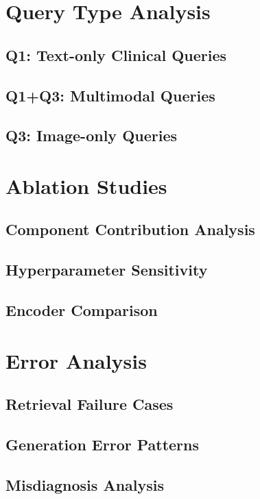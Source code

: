 %
%
\section{Query Type Analysis}
\label{sec:experiments:querytypes}

\subsection{Q1: Text-only Clinical Queries}
\label{subsec:experiments:querytypes:q1}

\subsection{Q1+Q3: Multimodal Queries}
\label{subsec:experiments:querytypes:q1q3}

\subsection{Q3: Image-only Queries}
\label{subsec:experiments:querytypes:q3}

%
%
\section{Ablation Studies}
\label{sec:experiments:ablation}

\subsection{Component Contribution Analysis}
\label{subsec:experiments:ablation:components}

\subsection{Hyperparameter Sensitivity}
\label{subsec:experiments:ablation:hyperparams}

\subsection{Encoder Comparison}
\label{subsec:experiments:ablation:encoders}

%
%
\section{Error Analysis}
\label{sec:experiments:errors}

\subsection{Retrieval Failure Cases}
\label{subsec:experiments:errors:retrieval}

\subsection{Generation Error Patterns}
\label{subsec:experiments:errors:generation}

\subsection{Misdiagnosis Analysis}
\label{subsec:experiments:errors:misdiagnosis}
